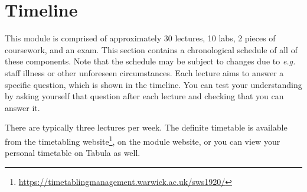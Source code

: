 \section{Timeline}
\label{sec:timeline}

This module is comprised of approximately 30 lectures, 10 labs, 2 pieces of coursework, and an exam. This section contains a chronological schedule of all of these components. Note that the schedule may be subject to changes due to \emph{e.g.} staff illness or other unforeseen circumstances. Each lecture aims to answer a specific question, which is shown in the timeline. You can test your understanding by asking yourself that question after each lecture and checking that you can answer it. 

There are typically three lectures per week. The definite timetable is available from the timetabling website\footnote{\url{https://timetablingmanagement.warwick.ac.uk/sws1920/}}, on the module website, or you can view your personal timetable on Tabula as well. 

\newcommand{\foo}{\makebox[0pt]{\textbullet}\hskip-0.5pt\vrule width 1pt\hspace{\labelsep}}

\newcommand{\LectureEntry}[4]{#1 & \begin{tabular}{p{11cm}}
		\textbf{#2} \\
		\emph{#3} \\
		#4
\end{tabular}}
\newcommand{\LabEntry}[3]{#1 & \begin{tabular}{p{11cm}}
		\textbf{#2} \\
		#3
\end{tabular}}

